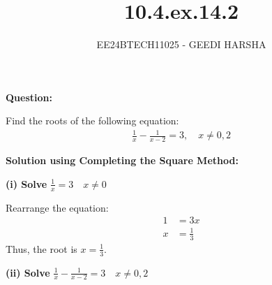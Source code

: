 \documentclass[journal]{IEEEtran}
\begin{document}

\vspace{3cm}
\title{10.4.ex.14.2}
\author{EE24BTECH11025 - GEEDI HARSHA}
{\let\newpage\relax\maketitle}

\renewcommand{\thefigure}{\theenumi}
\renewcommand{\thetable}{\theenumi}
\setlength{\intextsep}{10pt} %


\renewcommand{\thetable}{\theenumi}

\textbf{Question:}

Find the roots of the following equation:
\begin{align}
    \frac{1}{x} - \frac{1}{x-2} = 3, \quad x \neq 0,2
\end{align}


\textbf{Solution using Completing the Square Method:}

\textbf{(i) Solve } $\frac{1}{x} = 3 \quad x \neq 0$

Rearrange the equation:
\begin{align}
    1 &= 3x \\
    x &= \frac{1}{3}
\end{align}
Thus, the root is $x = \frac{1}{3}$.

\textbf{(ii) Solve } $\frac{1}{x} - \frac{1}{x-2} = 3 \quad x \neq 0,2$
\end{document}

